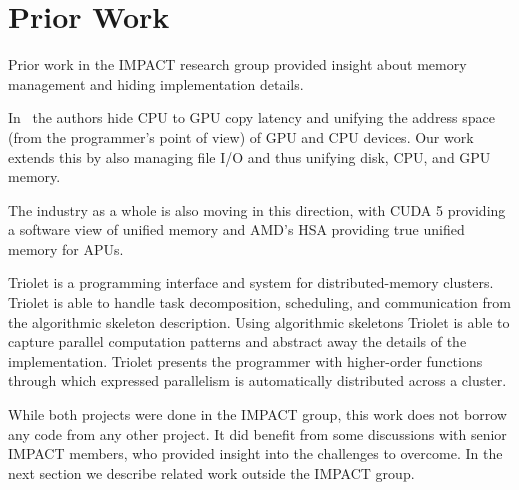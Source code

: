 \section{Prior Work}

Prior work in the IMPACT research group provided insight about memory
management and hiding implementation details.

In~\cite{gmac} the authors hide CPU
	to GPU copy latency and unifying the 
	address space (from the programmer's point of view)
	of GPU and CPU devices. 
Our work extends this by also managing file I/O and thus
	unifying disk, CPU, and GPU memory.

The industry as a whole is also moving in this direction, with CUDA 5 providing
a software view of unified memory and AMD's HSA providing true unified memory
for APUs.

Triolet\cite{rodrigues2014triolet} is a programming interface and system for
distributed-memory clusters. Triolet is able to handle
task decomposition, scheduling, and communication from the algorithmic skeleton description. Using algorithmic skeletons Triolet is able to capture parallel
computation patterns and abstract away the details of the implementation.
Triolet presents the programmer with higher-order functions through which
expressed parallelism is automatically distributed across a cluster.

While both projects were done in the IMPACT group, this work does
	not borrow any code from any other project. It did benefit from some
discussions with senior IMPACT members, who provided insight into the challenges to overcome.
In the next section we describe related work outside the IMPACT group.
